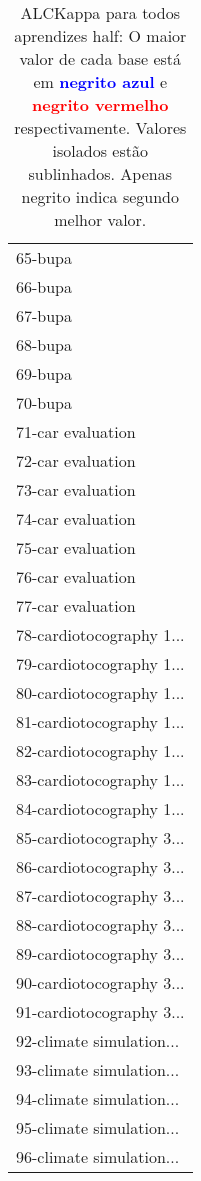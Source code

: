 \begin{table}[h]
\caption{ALCKappa para todos aprendizes half: O maior valor de cada base está em \textcolor{blue}{\textbf{negrito azul}} e \textcolor{red}{\textbf{negrito vermelho}} respectivamente. Valores isolados estão sublinhados. Apenas negrito indica segundo melhor valor.}
\begin{center}\begin{tabular}{l}
 & \\ \hline 65-bupa &  \\
66-bupa &  \\
67-bupa &  \\
68-bupa &  \\
69-bupa &  \\
70-bupa &  \\
71-car evaluation &  \\ \hline
72-car evaluation &  \\
73-car evaluation &  \\
74-car evaluation &  \\
75-car evaluation &  \\
76-car evaluation &  \\
77-car evaluation &  \\
78-cardiotocography 1... &  \\ \hline
79-cardiotocography 1... &  \\
80-cardiotocography 1... &  \\
81-cardiotocography 1... &  \\
82-cardiotocography 1... &  \\
83-cardiotocography 1... &  \\
84-cardiotocography 1... &  \\
85-cardiotocography 3... &  \\ \hline
86-cardiotocography 3... &  \\
87-cardiotocography 3... &  \\
88-cardiotocography 3... &  \\
89-cardiotocography 3... &  \\
90-cardiotocography 3... &  \\
91-cardiotocography 3... &  \\
92-climate simulation... &  \\ \hline
93-climate simulation... &  \\
94-climate simulation... &  \\
95-climate simulation... &  \\
96-climate simulation... &  \\\end{tabular}\label{stratsALCKappa2AllReduxb}
\end{center}
\end{table}
